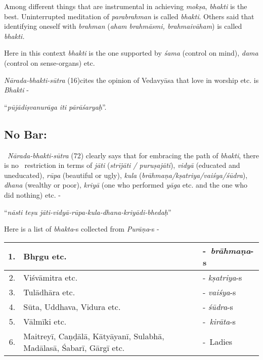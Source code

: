 Among different things that are instrumental in achieving \textit{mokṣa}, \textit{bhakti} is the best. Uninterrupted meditation of \textit{parabrahman} is called \textit{bhakti}. Others said that identifying oneself with \textit{brahman} (\textit{aham brahmāsmi, brahmaivāham}) is called \textit{bhakti.}

Here in this context \textit{bhakti} is the one supported by \textit{śama} (control on mind), \textit{dama} (control on sense-organs) etc.

\textit{Nārada-bhakti-sūtra} (16)cites the opinion of Vedavyāsa that love in worship etc. is \textit{Bhakti} -

\begin{myquote}
“\textit{pūjādiṣvanurāga iti pārāśaryaḥ}”.
\end{myquote}


\subsection*{No Bar:}

 \textit{Nārada-bhakti-sūtra} (72) clearly says that for embracing the path of \textit{bhakti}, there is no  restriction in terms of \textit{jāti} (\textit{strījāti / puruṣajāti}), \textit{vidyā} (educated and uneducated), \textit{rūpa} (beautiful or ugly), \textit{kula} (\textit{brāhmaṇa/kṣatriya/vaiśya/śūdra}), \textit{dhana} (wealthy or poor), \textit{kriyā} (one who performed \textit{yāga} etc. and the one who did nothing) etc. -

\begin{myquote}
“\textit{nāsti teṣu jāti-vidyā-rūpa-kula-dhana-kriyādi-bhedaḥ}”
\end{myquote}

Here is a list of \textit{bhakta}-s collected from \textit{Purāṇa}-s -

\begin{longtable}{|r|p{6cm}|l|}
\hline
1. & Bhṛgu etc. & - \textit{brāhmaṇa}-s \\
\hline
2. & Viśvāmitra etc. & - \textit{kṣatriya}-s \\
\hline
3. & Tulādhāra etc. & - \textit{vaiśya}-s \\
\hline
4. & Sūta, Uddhava, Vidura etc. & - \textit{śūdra}-s \\
\hline
5. & Vālmīki etc. & - \textit{kirāta}-s \\
\hline
6. & Maitreyī, Caṇḍālā, Kātyāyanī, Sulabhā, Madālasā, Śabarī, Gārgī etc. & - Ladies \\
\hline
\end{longtable}

